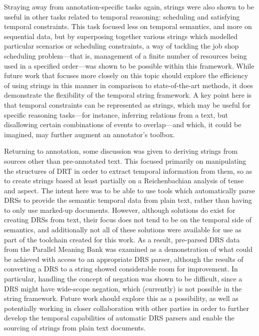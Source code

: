 \documentclass[a4paper,12pt,leqno,twoside]{article}
\begin{document}
Straying away from annotation-specific tasks again, strings were also shown to be useful in other tasks related to temporal reasoning: scheduling and satisfying temporal constraints. This task focused less on temporal semantics, and more on sequential data, but by superposing together various strings which modelled particular scenarios or scheduling constraints, a way of tackling the job shop scheduling problem---that is, management of a finite number of resources being used in a specified order---was shown to be possible within this framework. While future work that focuses more closely on this topic should explore the efficiency of using strings in this manner in comparison to state-of-the-art methods, it does demonstrate the flexibility of the temporal string framework. A key point here is that temporal constraints can be represented as strings, which may be useful for specific reasoning tasks---for instance, inferring relations from a text, but disallowing certain combinations of events to overlap---and which, it could be imagined, may further augment an annotator's toolbox.

Returning to annotation, some discussion was given to deriving strings from sources other than pre-annotated text. This focused primarily on manipulating the structures of DRT in order to extract temporal information from them, so as to create strings based at least partially on a Reichenbachian analysis of tense and aspect. The intent here was to be able to use tools which automatically parse DRSs to provide the semantic temporal data from plain text, rather than having to only use marked-up documents. However, although solutions do exist for creating DRSs from text, their focus does not tend to be on the temporal side of semantics, and additionally not all of these solutions were available for use as part of the toolchain created for this work. As a result, pre-parsed DRS data from the Parallel Meaning Bank was examined as a demonstration of what could be achieved with access to an appropriate DRS parser, although the results of converting a DRS to a string showed considerable room for improvement. In particular, handling the concept of negation was shown to be difficult, since a DRS might have wide-scope negation, which (currently) is not possible in the string framework. Future work should explore this as a possibility, as well as potentially working in closer collaboration with other parties in order to further develop the temporal capabilities of automatic DRS parsers and enable the sourcing of strings from plain text documents.
\end{document}
